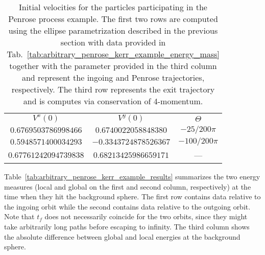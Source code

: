 \begin{table}[]
  \centering
  \begin{tabular}{ccc}
    \hline\hline
    $V^x(0)$              & $V^y(0)$              & $\Theta$       \\
    $0.6769503786998466$  & $0.6740022058848380$  & $-25/200 \pi$  \\
    $0.5948571400034293$  & $-0.3343724878526367$ & $-100/200 \pi$ \\
    $0.67761242094739838$ & $0.68213425986659171$ & ---            \\ \hline\hline
  \end{tabular}
  \caption{Initial velocities for the particles participating in the Penrose process example. The first two rows are computed using the ellipse parametrization described in the previous section with data provided in Tab.~\ref{tab:arbitrary_penrose_kerr_example_energy_mass} together with the parameter provided in the third column and represent the ingoing and Penrose trajectories, respectively. The third row represents the exit trajectory and is computes via conservation of 4-momentum.}
  \label{tab:arbitrary_penrose_kerr_example_velocities}
\end{table}

Table~\ref{tab:arbitrary_penrose_kerr_example_results} summarizes the two energy measures (local and global on the first and second column, respectively) at the time when they hit the background sphere. The first row contains data relative to the ingoing orbit while the second contains data relative to the outgoing orbit. Note that $t_f$ does not necessarily coincide for the two orbits, since they might take arbitrarily long paths before escaping to infinity. The third column shows the absolute difference between global and local energies at the background sphere.

\begin{table}[]
  \centering
  \caption{Energy measures at the time of collision with the background sphere. The first and second row represent the ingoing and the outgoing orbits, respectively. The third column shows the absolute difference between energy measures at the background sphere radius. Note that $t_f$ is not necessarily the same for both trajectories.}
  \label{tab:arbitrary_penrose_kerr_example_results}
\end{table}

